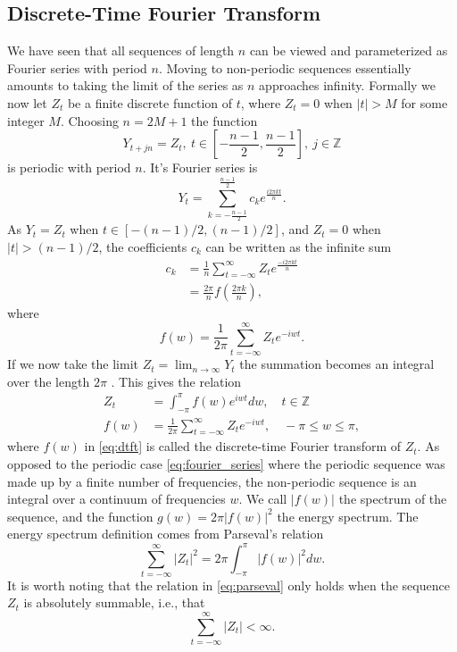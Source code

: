 \documentclass[a4paper]{memoir}
\theoremstyle{plain}
\theoremstyle{definition}
\theoremstyle{remark}
\begin{document}
\subsection{Discrete-Time Fourier Transform}
We have seen that all sequences of length $n$ can be viewed and parameterized as Fourier series with period $n$.
Moving to non-periodic sequences essentially amounts to taking the limit of the series as $n$ approaches infinity.
Formally we now let $Z_t$ be a finite discrete function of $t$, where $Z_t = 0$ when $|t| > M$ for some integer $M$.
Choosing $n = 2M + 1$ the function
\begin{equation*}
        Y_{t + jn} = Z_t, \ t \in \left[ -\frac{n-1}{2}, \frac{n-1}{2} \right], \ j \in \mathbb{Z}
\end{equation*}
is periodic with period $n$.
It's Fourier series is 
\begin{equation*}
        Y_t = \sum_{k = -\frac{n - 1}{2}}^{\frac{n -1 }{2}} c_k e^{\frac{i2 \pi kt}{n}}.
\end{equation*}
As $Y_t = Z_t$ when $t \in [-(n-1)/2, (n-1)/2]$, and $Z_t = 0$ when $|t| > (n-1)/2$, the coefficients $c_k$ can be written as the infinite sum
\begin{align*}
        c_k &= \frac{1}{n}\sum_{t = - \infty}^{\infty} Z_t e^{\frac{-i2\pi kt}{n}} \\
        & = \frac{2 \pi}{n}f\left(\frac{2\pi k}{n}\right),
\end{align*}
where 
\begin{equation*}
        f(w) = \frac{1}{2\pi} \sum_{t = -\infty}^{\infty} Z_t e^{-iwt}.
\end{equation*}
If we now take the limit $Z_t = \lim_{n \rightarrow \infty} Y_t$ the summation becomes an integral over the length $2\pi$ \cite{wei}.
This gives the relation
\begin{align}\label{eq:dtft_inv}
        Z_t &= \int_{-\pi}^{\pi} f(w) e^{iwt} dw, \quad t \in \mathbb{Z} \\
        \label{eq:dtft}
        f(w) &= \frac{1}{2 \pi} \sum_{t = -\infty}^{\infty} Z_t e^{-i w t}, \quad -\pi \leq w \leq \pi,
\end{align}
where $f(w)$ in \eqref{eq:dtft} is called the discrete-time Fourier transform of $Z_t$.
As opposed to the periodic case \eqref{eq:fourier_series} where the periodic sequence was made up by a finite number of frequencies, the non-periodic sequence is an integral over a continuum of frequencies $w$.
We call $|f(w)|$ the spectrum of the sequence, and the function $g(w) = 2 \pi |f(w)|^2$ the energy spectrum.
The energy spectrum definition comes from Parseval's relation 
\begin{equation}\label{eq:parseval}
        \sum_{t = -\infty}^{\infty} |Z_t|^2 = 2 \pi \int_{- \pi}^{\pi}|f(w)|^2 dw.
\end{equation}
It is worth noting that the relation in \eqref{eq:parseval} only holds when the sequence $Z_t$ is absolutely summable, i.e., that
\begin{equation}\label{eq:absuletly_summable}
        \sum_{ t = -\infty}^{\infty}|Z_t| < \infty.
\end{equation}
\end{document}

